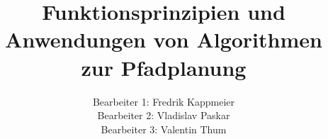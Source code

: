 \documentclass[envcountsame,envcountchap, deutsch]{i-studis}
\begin{document}
\title{Funktionsprinzipien und Anwendungen von Algorithmen zur Pfadplanung}
\author{Bearbeiter 1: Fredrik Kappmeier \\Bearbeiter 2: Vladislav Paskar \\Bearbeiter 3: Valentin Thum}							%
\address{Trier,} 							%
\begingroup
  \renewcommand{\thepage}{Titel}
  \mytitlepage
  \newpage
\endgroup
\frontmatter 
\tableofcontents 						%
\mainmatter                        		%






\backmatter                        		%
\printindex 							%
\begin{appendix}						%
\end{appendix}
\end{document}
